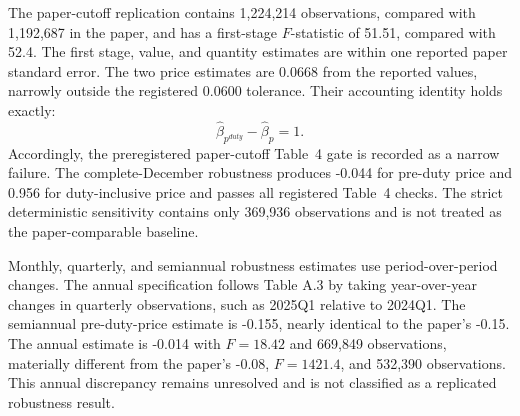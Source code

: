 The paper-cutoff replication contains 1,224,214 observations, compared with
1,192,687 in the paper, and has a first-stage $F$-statistic of 51.51, compared
with 52.4. The first stage, value, and quantity estimates are within one
reported paper standard error. The two price estimates are 0.0668 from the
reported values, narrowly outside the registered 0.0600 tolerance. Their
accounting identity holds exactly:
\begin{equation}
\widehat\beta_{p^{duty}}-\widehat\beta_p=1.
\end{equation}
Accordingly, the preregistered paper-cutoff Table~4 gate is recorded as a
narrow failure. The complete-December robustness produces -0.044 for
pre-duty price and 0.956 for duty-inclusive price and passes all registered
Table~4 checks. The strict deterministic sensitivity contains only 369,936
observations and is not treated as the paper-comparable baseline.

Monthly, quarterly, and semiannual robustness estimates use period-over-period
changes. The annual specification follows Table A.3 by taking year-over-year
changes in quarterly observations, such as 2025Q1 relative to 2024Q1.
The semiannual pre-duty-price estimate is -0.155, nearly identical to the
paper's -0.15. The annual estimate is -0.014 with $F=18.42$ and 669,849
observations, materially different from the paper's -0.08, $F=1421.4$, and
532,390 observations. This annual discrepancy remains unresolved and is not
classified as a replicated robustness result.
